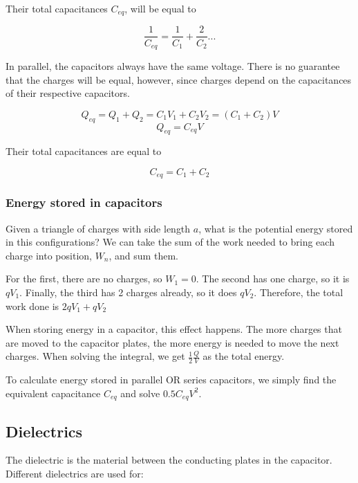 \documentclass{article}
\begin{document}
Their total capacitances $C_{eq}$, will be equal to 

\begin{equation} \frac{1}{C_{eq}}=\frac{1}{C_1}+\frac{2}{C_2}... \end{equation}

In parallel, the capacitors always have the same voltage. There is no guarantee that the charges will be equal, however, since charges depend on the capacitances of their respective capacitors.

\begin{equation} Q_{eq}=Q_1+Q_2=C_1V_1+C_2V_2=(C_1+C_2)V \end{equation}
\begin{equation} Q_{eq}=C_{eq}V \end{equation}

Their total capacitances are equal to 

\begin{equation} C_{eq}=C_1+C_2 \end{equation}

\subsubsection{Energy stored in capacitors}

Given a triangle of charges with side length $a$, what is the potential energy stored in this configurations? We can take the sum of the work needed
to bring each charge into position, $W_n$, and sum them.

For the first, there are no charges, so $W_1=0$. The second has one charge, so it is $qV_1$. Finally, the third has 2 charges already, so it does $qV_2$. Therefore,
the total work done is $2qV_1+qV_2$

When storing energy in a capacitor, this effect happens. The more charges that are moved to the capacitor plates, the more energy is needed to move the next charges. When solving the integral, we get $\frac{1}{2} \frac{Q}{V}$ as the total energy.

To calculate energy stored in parallel OR series capacitors, we simply find the equivalent capacitance $C_{eq}$ and solve $0.5 C_{eq} V^2$.

\subsection{Dielectrics}

The dielectric is the material between the conducting plates in the capacitor. 
Different dielectrics are used for: 
\end{document}
